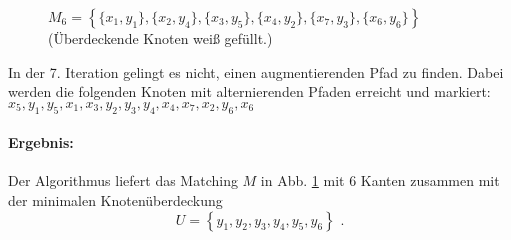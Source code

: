 \documentclass[a4paper]{scrartcl}
\begin{document}
\begin{enumerate}[label=\bfseries\arabic*.]
\begin{enumerate}
\begin{figure}[h]
                    \caption{$M_6 = \left\{ \{x_1, y_1\}, \{x_2, y_4\}, 
                    \{x_3, y_5\}, \{x_4, y_2\}, \{x_7, y_3\}, \{x_6, y_6\}
                    \right\}$ \\ (Überdeckende Knoten weiß gefüllt.)}
                    \label{fig:a-6}
                \end{figure}

                \FloatBarrier

                In der 7. Iteration gelingt es nicht, einen augmentierenden Pfad
                zu finden.
                Dabei werden die folgenden Knoten mit alternierenden Pfaden
                erreicht und markiert:
                $x_5, y_1, y_5, x_1, x_3, y_2, y_3, y_4, x_4, x_7, x_2, y_6, x_6$

                \paragraph{Ergebnis:}
                Der Algorithmus liefert das Matching $M$ in Abb. \ref{fig:a-6}
                mit $6$ Kanten zusammen mit der minimalen Knotenüberdeckung
                \begin{equation}
                    U = \left\{ y_1, y_2, y_3, y_4, y_5, y_6 \right\} \text{ .}
                \end{equation}


\end{enumerate}
\end{enumerate}
\end{document}
